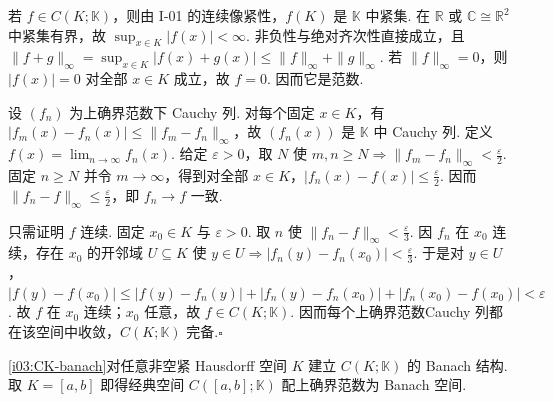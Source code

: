 \begin{FAProof}
若 \(\displaystyle f\in C(K;\mathbb K)\)，则由 I-01 的连续像紧性，\(\displaystyle f(K)\) 是 \(\displaystyle \mathbb K\) 中紧集. 在 \(\displaystyle \mathbb R\) 或 \(\displaystyle \mathbb C\cong\mathbb R^2\) 中紧集有界，故 \(\displaystyle \sup_{x\in K}|f(x)|<\infty\). 非负性与绝对齐次性直接成立，且 \(\displaystyle \|f+g\|_\infty =\sup_{x\in K}|f(x)+g(x)| \leqslant\|f\|_\infty+\|g\|_\infty\).
若 \(\displaystyle \|f\|_\infty=0\)，则 \(\displaystyle |f(x)|=0\) 对全部 \(\displaystyle x\in K\) 成立，故 \(\displaystyle f=0\). 因而它是范数.

设 \(\displaystyle (f_n)\) 为上确界范数下 Cauchy 列. 对每个固定 \(\displaystyle x\in K\)，有 \(\displaystyle |f_m(x)-f_n(x)|\leqslant\|f_m-f_n\|_\infty\)，故 \(\displaystyle (f_n(x))\) 是 \(\displaystyle \mathbb K\) 中 Cauchy 列. 定义 \(\displaystyle f(x)=\lim_{n\to\infty}f_n(x)\). 给定 \(\displaystyle \varepsilon>0\)，取 \(\displaystyle N\) 使 \(\displaystyle m,n\geqslant N\Rightarrow\|f_m-f_n\|_\infty<\frac{\varepsilon}{2}\). 固定 \(\displaystyle n\geqslant N\) 并令 \(\displaystyle m\to\infty\)，得到对全部 \(\displaystyle x\in K\)，\(\displaystyle |f_n(x)-f(x)|\leqslant\frac{\varepsilon}{2}\). 因而 \(\displaystyle \|f_n-f\|_\infty\leqslant\frac{\varepsilon}{2}\)，即 \(\displaystyle f_n\to f\) 一致.

只需证明 \(\displaystyle f\) 连续. 固定 \(\displaystyle x_0\in K\) 与 \(\displaystyle \varepsilon>0\). 取 \(\displaystyle n\) 使 \(\displaystyle \|f_n-f\|_\infty<\frac{\varepsilon}{3}\). 因 \(\displaystyle f_n\) 在 \(\displaystyle x_0\) 连续，存在 \(\displaystyle x_0\) 的开邻域 \(\displaystyle U\subseteq K\) 使
\(\displaystyle y\in U\Rightarrow |f_n(y)-f_n(x_0)|<\frac{\varepsilon}{3}\).
于是对 \(\displaystyle y\in U\)，
\(\displaystyle |f(y)-f(x_0)|\leqslant|f(y)-f_n(y)|+|f_n(y)-f_n(x_0)|+|f_n(x_0)-f(x_0)|<\varepsilon\).
故 \(\displaystyle f\) 在 \(\displaystyle x_0\) 连续；\(\displaystyle x_0\) 任意，故 \(\displaystyle f\in C(K;\mathbb K)\). 因而每个上确界范数Cauchy 列都在该空间中收敛，\(\displaystyle C(K;\mathbb K)\) 完备.\hfill\(\square\)
\end{FAProof}

\begin{FAExample}[标准连续函数空间]
\autoref{i03:CK-banach}对任意非空紧 Hausdorff 空间 \(\displaystyle K\) 建立 \(\displaystyle C(K;\mathbb K)\) 的 Banach 结构. 取 \(\displaystyle K=[a,b]\) 即得经典空间 \(\displaystyle C([a,b];\mathbb K)\) 配上确界范数为 Banach 空间.
\end{FAExample}

